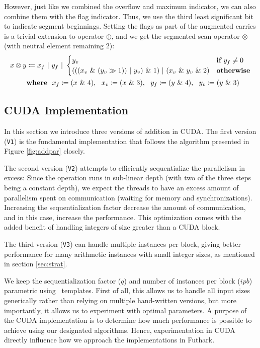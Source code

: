 However, just like we combined the overflow and maximum indicator, we can also
combine them with the flag indicator. Thus, we use the third least significant
bit to indicate segment beginnings. Setting the flags as part of the augmented
carries is a trivial extension to operator $\oplus$, and we get the segmented scan
operator $\otimes$ (with neutral element remaining $2$):
\begin{align}
  \label{eq:segscanop}
  x \otimes y &\coloneq x_f~|~y_f~|~\begin{cases} y_v & \textbf{if}~y_f \neq 0 \\ (((x_v~\&~(y_v \gg 1))~|~y_v)~\&~1)~|~(x_v~\&~y_v~\&~2) & \textbf{otherwise}\end{cases}\\
  & \textbf{where}~~x_f\coloneq (x~\&~4),~~x_v\coloneq (x~\&~3),~~y_f\coloneq (y~\&~4),~~y_v\coloneq (y~\&~3)\notag
\end{align}

\subsection{CUDA Implementation}
\label{subsec:addcud}

In this section we introduce three versions of addition in CUDA. The first
version (\texttt{V1}) is the fundamental implementation that follows the
algorithm presented in Figure \ref{fig:addpar} closely.

The second version (\texttt{V2}) attempts to efficiently sequentialize the
parallelism in excess: Since the operation runs in sub-linear depth (with two of
the three steps being a constant depth), we expect the threads to have an excess
amount of parallelism spent on communication (waiting for memory and
synchronizations). Increasing the sequentialization factor decrease the amount
of communication, and in this case, increase the performance. This optimization
comes with the added benefit of handling integers of size greater than a CUDA
block.

The third version (\texttt{V3}) can handle multiple instances per block, giving
better performance for many arithmetic instances with small integer sizes, as
mentioned in section \ref{sec:strat}.

We keep the sequentialization factor ($q$) and number of instances per block
($\mathit{ipb}$) parametric using \cpp\ templates. First of all, this allows us
to handle all input sizes generically rather than relying on multiple
hand-written versions, but more importantly, it allows us to experiment with
optimal parameters. A purpose of the CUDA implementation is to determine how
much performance is possible to achieve using our designated algorithms. Hence,
experimentation in CUDA directly influence how we approach the implementations
in Futhark.

